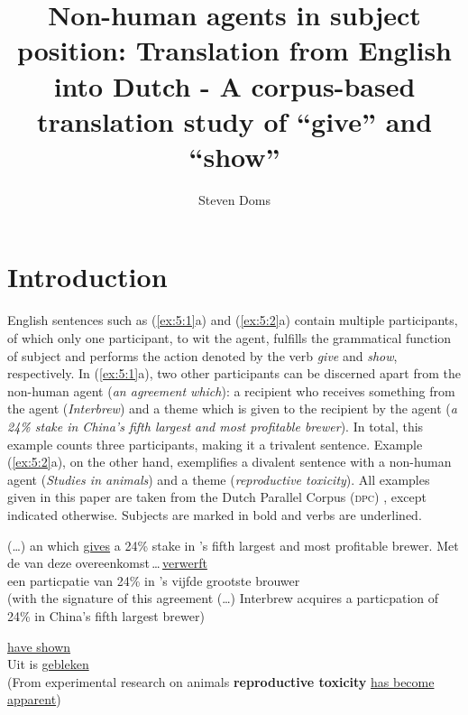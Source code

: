 \documentclass[output=paper]{LSP/langsci}
\author{Steven Doms}
\title{Non-human agents in subject position: {T}ranslation from {English into Dutch} - A corpus-based translation study of “give” and “show”}
\begin{document}
\section{Introduction}
English sentences such as (\ref{ex:5:1}a) and (\ref{ex:5:2}a) contain multiple participants, of which only one participant, to wit the agent, fulfills the grammatical function of subject and performs the action denoted by the verb \textit{give} and \textit{show}, respectively. In (\ref{ex:5:1}a), two other participants can be discerned apart from the non-human agent (\textit{an agreement which}): a recipient who receives something from the agent (\textit{Interbrew}) and a theme which is given to the recipient by the agent (\textit{a 24\% stake in China’s fifth largest and most profitable brewer}). In total, this example counts three participants, making it a trivalent sentence. Example (\ref{ex:5:2}a), on the other hand, exemplifies a divalent sentence with a non-human agent (\textit{Studies in animals}) and a theme (\textit{reproductive toxicity}). All examples given in this paper are taken from the Dutch Parallel Corpus (\textsc{dpc}) \citep[see][]{Rura2008}, except indicated otherwise. Subjects are marked in bold and verbs are underlined.


\ea \label{ex:5:1}
  \ea 
  (\dots) an   which \ul{gives}  a 24\% stake in 's fifth largest and most profitable brewer. 
  \ex Met de  van deze overeenkomst\,{\dots}\,\ul{verwerft}\,{}\hspace*{-12mm}\,\\ 	een particpatie van 24\% in 's vijfde grootste brouwer \\
(with the signature of this agreement (\dots) Interbrew acquires a particpation of 24\% in China's fifth largest brewer)
  \z 
\z 
{} 


\ea \label{ex:5:2}
 \ea {} \ul{have shown}  
\\[1em]
\ex Uit  is     \ul{gebleken}\\
(From experimental research on animals \textbf{reproductive toxicity} \ul{has become apparent})
  \z
\z
\end{document}
